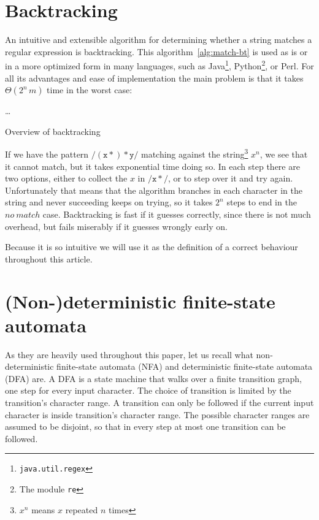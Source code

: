 \documentclass[11pt,a4paper,twoside,openright]{Thesis}
\theoremstyle{definition}
\newcommand{\regex}[1]{\ensuremath{\mathtt{/#1/}}}
\newcommand{\seclabel}[1]{\label{sec:#1}}
\begin{document}
\section{Backtracking}\seclabel{backtracking}
An intuitive and extensible algorithm for determining whether a string
matches a regular expression is backtracking. This
algorithm~\ref{alg:match-bt} is used as is or in a more optimized form in
many languages, such as Java\footnote{\texttt{java.util.regex}},
Python\footnote{The module \texttt{re}}, or Perl\cite{Cox07a}. For all its
advantages and ease of implementation the main problem is that it takes
$\Theta(2^n\,m)$ time in the worst case:

\begin{algorithm*}
  \begin{algorithmic}
      \State {}
      \State {}
        \State {}
      \Else
        \State {}
      \EndIf
    \ElsIf{\dots}
      \State \dots
    \EndIf
  \EndFunction
  \end{algorithmic}
  \caption{\label{alg:match-bt}Overview of backtracking}
\end{algorithm*}

If we have the pattern \regex{(x*)*y} matching against the
string\footnote{$x^n$ means $x$ repeated $n$ times} $x^n$, we see that it
cannot match, but it takes exponential time doing so. In each step there
are two options, either to collect the $x$ in \regex{x*}, or to step over it
and try again. Unfortunately that means that the algorithm branches in each
character in the string and never succeeding keeps on trying, so it takes $2^n$
steps to end in the $no\ match$ case.  Backtracking is fast if it guesses
correctly, since there is not much overhead, but fails miserably if it guesses
wrongly early on.

Because it is so intuitive we will use it as the definition of a correct 
behaviour throughout this article.

\section{(Non-)deterministic finite-state automata}
As they are heavily used throughout this paper, let us recall what
non-deterministic finite-state automata (NFA) and deterministic finite-state
automata (DFA) are. A DFA is a state machine that walks over a finite
transition graph, one step for every input character. The choice of transition
is limited by the transition's character range. A transition can only be
followed if the current input character is inside transition's character
range. The possible character ranges are assumed to be disjoint, so that in
every step at most one transition can be followed.
\end{document}
